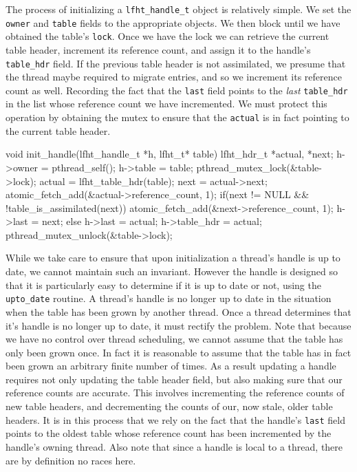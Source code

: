 The process of initializing a \texttt{lfht\_handle\_t} object is relatively simple.
We set the \texttt{owner} and  \texttt{table} fields to the appropriate objects.
We then block until we have obtained the table's \texttt{lock}. Once we have the lock
we can retrieve the current table header, increment its reference count, and
assign it to the handle's \texttt{table\_hdr} field. If the previous table header
is not assimilated, we presume that the thread maybe required to migrate entries,
and so we increment its reference count as well. Recording the fact that
the \texttt{last} field points to the {\em last}  \texttt{table\_hdr} in the list
whose reference count we have incremented.
We must protect this operation by obtaining the mutex to ensure that the \texttt{actual}
is in fact pointing to the current table header.


\begin{center}
\begin{clisting}
void init_handle(lfht_handle_t *h, lfht_t* table){
  lfht_hdr_t *actual, *next;
  h->owner = pthread_self();
  h->table = table;
  pthread_mutex_lock(&table->lock);
  actual = lfht_table_hdr(table);
  next = actual->next;
  atomic_fetch_add(&actual->reference_count, 1);
  if(next != NULL && !table_is_assimilated(next)){
    atomic_fetch_add(&next->reference_count, 1);
    h->last = next;
  } else {
    h->last = actual;
  }
  h->table_hdr = actual;
  pthread_mutex_unlock(&table->lock);
}
\end{clisting}
\end{center}

While we take care to ensure that upon initialization a thread's handle is up to date,
we cannot maintain such an invariant. However the handle is designed so that it is particularly
easy to determine if it is up to date or not, using the  \texttt{upto\_date} routine.
A thread's handle is no longer up to date in the situation when the table has been grown by another thread.
Once a thread determines that it's handle is no longer up to date, it must rectify the problem.
Note that because we have no control over thread scheduling, we cannot assume that
the table has only been grown once. In fact it is reasonable to assume that the table
has in fact been grown an arbitrary finite number of times. As a result updating
a handle requires not only updating the table header field, but also making sure
that our reference counts are accurate. This involves incrementing the reference counts
of new table headers, and decrementing the counts of our, now stale, older table headers.
It is in this process that we rely on the fact that the handle's \texttt{last} field
points to the oldest table whose reference count has been incremented by the handle's owning thread.
Also note that since a handle is local to a thread, there are by definition no races here.

